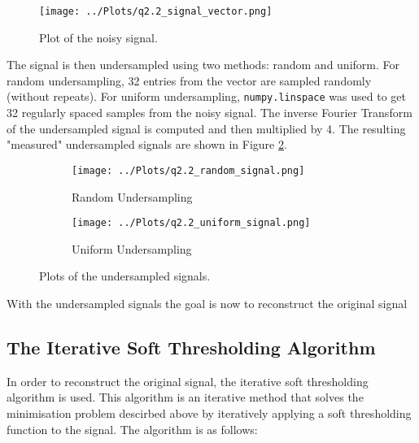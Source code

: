 \documentclass[12pt]{report} %
\begin{document}
\begin{figure}[htbp]
    \centering
    \texttt{[image: ../Plots/q2.2\_signal\_vector.png]}
    \caption{Plot of the noisy signal.}
    \label{fig:noisy_signal}
\end{figure}

The signal is then undersampled using two methods: random and uniform. For random undersampling, 32 entries from the vector are sampled randomly (without repeats). For uniform undersampling, \texttt{numpy.linspace} was used to get 32 regularly spaced samples from the noisy signal. The inverse Fourier Transform of the undersampled signal is computed and then multiplied by 4. The resulting "measured" undersampled signals are shown in Figure \ref{fig:undersampled_signals}.

\begin{figure}[htbp]
    \centering
    \begin{subfigure}[b]{0.45\textwidth}
        \texttt{[image: ../Plots/q2.2\_random\_signal.png]}
        \caption{Random Undersampling}
    \end{subfigure}
    \hfill
    \begin{subfigure}[b]{0.45\textwidth}
        \texttt{[image: ../Plots/q2.2\_uniform\_signal.png]}
        \caption{Uniform Undersampling}
    \end{subfigure}
    \caption{Plots of the undersampled signals.}
    \label{fig:undersampled_signals}
\end{figure}

With the undersampled signals the goal is now to reconstruct the original signal


\subsection{The Iterative Soft Thresholding Algorithm}

In order to reconstruct the original signal, the iterative soft thresholding algorithm is used. This algorithm is an iterative method that solves the  minimisation problem descirbed above by iteratively applying a soft thresholding function to the signal. The algorithm is as follows:
\end{document}
